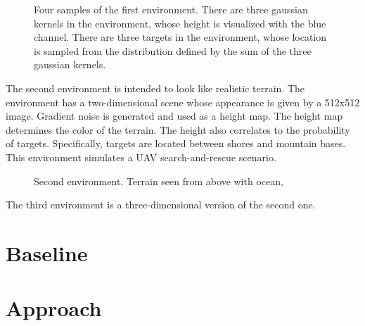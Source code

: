 \begin{figure}
    \centering
    
    \label{fig:gaussian}
    \caption{Four samples of the first environment. There are three gaussian kernels in the environment, whose height is visualized with the blue channel. There are three targets in the environment, whose location is sampled from the distribution defined by the sum of the three gaussian kernels.}
\end{figure}

The second environment is intended to look like realistic terrain.
The environment has a two-dimensional scene whose appearance is given by a 512x512 image.
Gradient noise is generated and used as a height map.
The height map determines the color of the terrain.
The height also correlates to the probability of targets.
Specifically, targets are located between shores and mountain bases.
This environment simulates a UAV search-and-rescue scenario.

\begin{figure}
    \centering
    
    \label{fig:terrain}
    \caption{Second environment. Terrain seen from above with ocean, }
\end{figure}

The third environment is a three-dimensional version of the second one.



\section{Baseline}
\label{sec:baseline}

\section{Approach}
\label{sec:approach}




